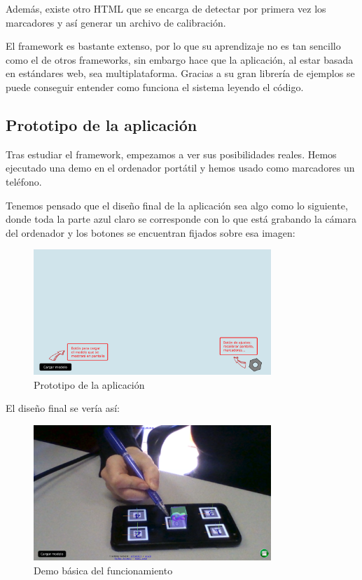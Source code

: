 \documentclass[12pt,a4paper]{article}
\begin{document}
Además, existe otro HTML que se encarga de detectar por primera vez los marcadores y así generar un archivo de calibración.

El framework es bastante extenso, por lo que su aprendizaje no es tan sencillo como el de otros frameworks, sin embargo hace que la aplicación, al estar basada en estándares web, sea multiplataforma. Gracias a su gran librería de ejemplos se puede conseguir entender como funciona el sistema leyendo el código. 

\subsection{Prototipo de la aplicación}

Tras estudiar el framework, empezamos a ver sus posibilidades reales. Hemos ejecutado una demo en el ordenador portátil y hemos usado como marcadores un teléfono.

Tenemos pensado que el diseño final de la aplicación sea algo como lo siguiente, donde toda la parte azul claro se corresponde con lo que está grabando la cámara del ordenador y los botones se encuentran fijados sobre esa imagen:

\begin{figure}[H]
    \centering
        \includegraphics[width=0.8\textwidth]{proto.png}
        \caption{Prototipo de la aplicación}
        \label{fig:my_label}
\end{figure}

El diseño final se vería así:

\begin{figure}[H]
\centering
    \includegraphics[width=0.8\textwidth]{fin_design.png}
    \caption{Demo básica del funcionamiento}
\end{figure}
\end{document}
